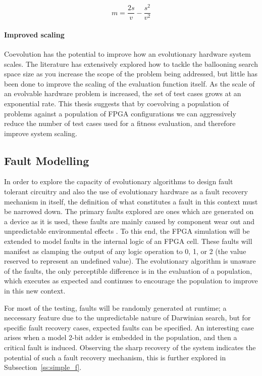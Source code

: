 \begin{equation}
	\label{equ:vir}
	m = \frac{2s}{v} - \frac{s^2}{v^2}
\end{equation}

\paragraph{Improved scaling}
Coevolution has the potential to improve how an evolutionary hardware system scales.
The literature has extensively explored how to tackle the ballooning search space size
as you increase the scope of the problem being addressed, but little has been done
to improve the scaling of the evaluation function itself. As the scale
of an evolvable hardware problem is increased, the set of test cases grows at an exponential rate.
This thesis suggests that by coevolving a population of problems against a population of FPGA
configurations we can aggressively reduce the number of test cases used for a fitness
evaluation, and therefore improve system scaling.

\subsection{Fault Modelling}
In order to explore the capacity of evolutionary algorithms to design fault
tolerant circuitry and also the use of evolutionary hardware as a fault
recovery mechanism in itself, the definition of what constitutes a fault in
this context must be narrowed down. The primary faults explored are ones which
are
generated on a device as it is used, these faults are mainly caused by
component wear out and unpredictable environmental effects \cite{4291951}. To
this end, the FPGA simulation will be extended to model
faults in the internal logic of an FPGA cell. These faults will manifest as clamping
the output of any logic operation to 0, 1, or 2 (the value reserved to represent
an undefined value). The evolutionary algorithm is unaware of the
faults, the only perceptible difference is in the evaluation of a population,
which executes as expected and continues to encourage the population to improve in this
new context.

For most of the testing, faults will be randomly generated at runtime; a neccessary
feature due to the unpredictable nature of Darwinian search, but for specific
fault recovery cases, expected faults can be specified. An interesting case arises when
a model 2-bit adder is embedded in the population, and then a critical fault is
induced. Observing the sharp recovery of the system indicates the potential of
such a fault recovery mechanism, this is further explored in Subsection~\ref{ss:simple_f}.

